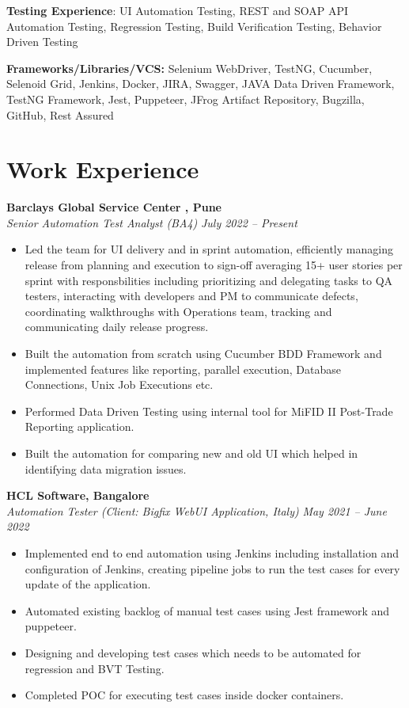 \documentclass[margin,line]{resume}
\begin{document}
\begin{resume}
     \textbf{Testing Experience}: UI Automation Testing, REST and SOAP API Automation Testing, Regression Testing, Build Verification Testing, Behavior Driven Testing
      
      \textbf{Frameworks/Libraries/VCS:} Selenium WebDriver, TestNG, Cucumber, Selenoid Grid, Jenkins, Docker, JIRA, Swagger, JAVA Data Driven Framework, TestNG Framework, Jest, Puppeteer, JFrog Artifact Repository, Bugzilla, GitHub, Rest Assured
 
    \section{\mysidestyle Work Experience}
    \textbf{Barclays Global Service Center , Pune}\\
        \textsl{Senior Automation Test Analyst (BA4)} \hfill \textsl{July 2022 -- Present}\vspace{0mm}
        
        \begin{itemize}
            \item Led the team for UI delivery and in sprint automation, efficiently managing release from planning and execution to sign-off averaging 15+ user stories per sprint with responsbilities including prioritizing and delegating tasks to QA testers, interacting with developers and PM to communicate defects, coordinating walkthroughs with Operations team, tracking and communicating daily release progress.
            \item Built the automation from scratch using Cucumber BDD Framework and implemented features like reporting, parallel execution, Database Connections, Unix Job Executions etc.
            \item Performed Data Driven Testing using internal tool for MiFID II Post-Trade Reporting application.
            \item Built the automation for comparing new and old UI which helped in identifying data migration issues.
        \end{itemize}
    \textbf{HCL Software, Bangalore}\\
           \textsl{Automation Tester (Client: Bigfix WebUI Application, Italy)} \hfill \textsl{May 2021 -- June 2022} \vspace{1mm}%
           
        \begin{itemize}
            \item Implemented end to end automation using Jenkins including installation and configuration of Jenkins, creating pipeline jobs to run the test cases for every update of the application.
            \item Automated existing backlog of manual test cases using Jest framework and puppeteer.
            \item Designing and developing test cases which needs to be automated for regression and BVT Testing.
           \item Completed POC for executing test cases inside docker containers.
        \end{itemize}
    \newpage

\end{resume}
\end{document}
